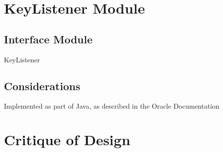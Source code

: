 \documentclass[12pt]{article}
\begin{document}
\section*{KeyListener Module}

\subsection*{Interface Module}

KeyListener

\subsection*{Considerations}

Implemented as part of Java, as described in the Oracle Documentation

\newpage


\section*{Critique of Design}
\end{document}
